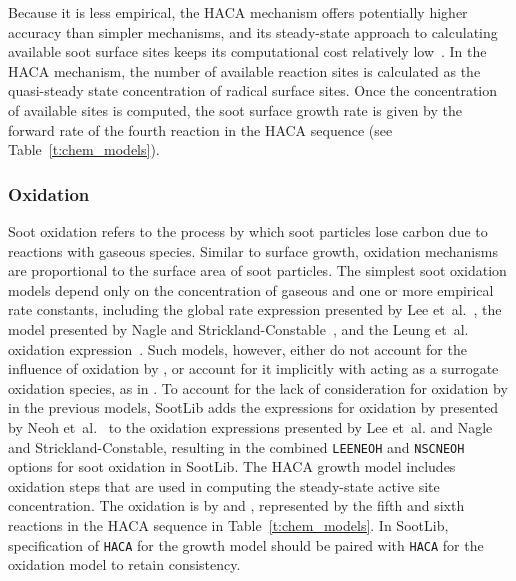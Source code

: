 \documentclass[preprint,letterpaper]{elsarticle}
\begin{document}
Because it is less empirical, the HACA mechanism offers potentially higher accuracy than simpler mechanisms, and its steady-state approach to calculating available soot surface sites keeps its computational cost relatively low~\cite{Appel_2000}. In the HACA mechanism, the number of available reaction sites is calculated as the quasi-steady state concentration of radical surface sites. Once the concentration of available sites is computed, the soot surface growth rate is given by the forward rate of the fourth reaction in the HACA sequence (see Table~\ref{t:chem_models}).


\subsubsection{Oxidation}
\label{s:oxi}

Soot oxidation refers to the process by which soot particles lose carbon due to reactions with gaseous species. Similar to surface growth, oxidation mechanisms are proportional to the surface area of soot particles.
The simplest soot oxidation models depend only on the concentration of gaseous  and one or more empirical rate constants, including the global rate expression presented by Lee et~al.~\cite{Lee_1962}, the model presented by Nagle and Strickland-Constable~\cite{Nagle_1962}, and the Leung et~al. oxidation expression~\cite{Leung_1991}.
Such models, however, either do not account for the influence of oxidation by , or account for it implicitly with  acting as a surrogate oxidation species, as in \cite{Leung_1991}. To account for the lack of consideration for oxidation by  in the previous models, SootLib adds the expressions for oxidation by  presented by Neoh et~al.~\cite{Neoh_1980,Neoh_1981} to the oxidation expressions presented by Lee et~al. and Nagle and Strickland-Constable, resulting in the combined \texttt{LEE\textunderscore NEOH} and \texttt{NSC\textunderscore NEOH} options for soot oxidation in SootLib.
The HACA growth model includes oxidation steps that are used in computing the steady-state active site concentration. The oxidation is by  and , represented by the fifth and sixth reactions in the HACA sequence in Table~\ref{t:chem_models}. In SootLib, specification of \texttt{HACA} for the growth model should be paired with \texttt{HACA} for the oxidation model to retain consistency. 

\end{document}
